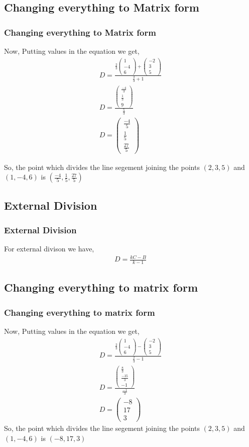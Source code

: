 \documentclass{beamer}
\providecommand{\brak}[1]{\ensuremath{\left(#1\right)}}
\theoremstyle{remark}
\newcommand{\myvec}[1]{\ensuremath{\begin{pmatrix}#1\end{pmatrix}}}
\numberwithin{equation}{section}
\begin{document}
\subsection{Changing everything to Matrix form}
\begin{frame}
\frametitle{Changing everything to Matrix form}
Now, Putting values in the equation we get,
\begin{align}
D = \frac{\frac{2}{3}
 \myvec{
   1
   \\
   -4
   \\
   6
 }
 +
 \myvec{
   -2
   \\
   3 
   \\
   5
 }}{\frac{2}{3}+1}
 \\
 D = \frac{
  \myvec{
  \frac{-4}{3}
  \\
  \frac{1}{3}
  \\
  9
  }
  }{\frac{5}{3}}
  \\
D = 
 \myvec{
  \frac{-4}{5}
  \\
  \frac{1}{5}
  \\
  \frac{27}{5}
 }
 \end{align}
 
So, the point which divides the line segement joining the points \brak{2, 3, 5} and \brak{1, -4, 6} is \brak{\frac{-4}{5}, \frac{1}{5}, \frac{27}{5}}

\end{frame}
\subsection{External Division}
\begin{frame}
\frametitle{External Division}
For external divison we have,
\begin{align}
    D = \frac{kC - B}{k - 1}
\end{align}
\end{frame}

\subsection{Changing everything to matrix form}
\begin{frame}
\frametitle{Changing everything to matrix form}
Now, Putting values in the equation we get,
\begin{align}
D = \frac{\frac{2}{3}
 \myvec{
   1
   \\
   -4
   \\
   6
 }
 -
 \myvec{
   -2
   \\
   3 
   \\
   5
 }}{\frac{2}{3}-1}
 \\
 D = \frac{
  \myvec{
  \frac{8}{3}
  \\
  \frac{-35}{3}
  \\
  -1
  }
  }{\frac{-1}{3}}
  \\
D = 
 \myvec{
  -8
  \\
  17
  \\
  3
 }
 \end{align}
 So, the point which divides the line segement joining the points \brak{2, 3, 5} and \brak{1, -4, 6} is \brak{-8, 17, 3}
    
\end{frame}
\end{document}
